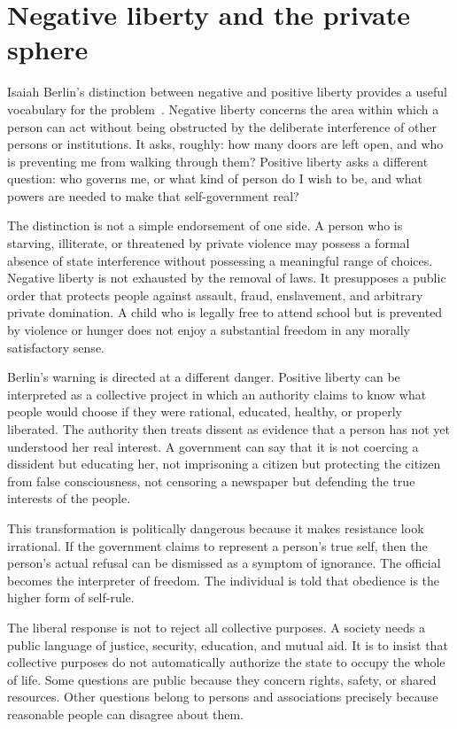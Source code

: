 ﻿\documentclass[12pt,a4paper]{book}
\begin{document}
\section{Negative liberty and the private sphere}

Isaiah Berlin's distinction between negative and positive liberty provides a
useful vocabulary for the problem~\cite{berlin-liberty}.  Negative liberty
concerns the area within which a person can act without being obstructed by
the deliberate interference of other persons or institutions.  It asks,
roughly: how many doors are left open, and who is preventing me from walking
through them?  Positive liberty asks a different question: who governs me,
or what kind of person do I wish to be, and what powers are needed to make
that self-government real?

The distinction is not a simple endorsement of one side.  A person who is
starving, illiterate, or threatened by private violence may possess a formal
absence of state interference without possessing a meaningful range of
choices.  Negative liberty is not exhausted by the removal of laws.  It
presupposes a public order that protects people against assault, fraud,
enslavement, and arbitrary private domination.  A child who is legally free
to attend school but is prevented by violence or hunger does not enjoy a
substantial freedom in any morally satisfactory sense.

Berlin's warning is directed at a different danger.  Positive liberty can
be interpreted as a collective project in which an authority claims to know
what people would choose if they were rational, educated, healthy, or
properly liberated.  The authority then treats dissent as evidence that a
person has not yet understood her real interest.  A government can say that
it is not coercing a dissident but educating her, not imprisoning a citizen
but protecting the citizen from false consciousness, not censoring a
newspaper but defending the true interests of the people.

This transformation is politically dangerous because it makes resistance
look irrational.  If the government claims to represent a person's true
self, then the person's actual refusal can be dismissed as a symptom of
ignorance.  The official becomes the interpreter of freedom.  The individual
is told that obedience is the higher form of self-rule.

The liberal response is not to reject all collective purposes.  A society
needs a public language of justice, security, education, and mutual aid.  It
is to insist that collective purposes do not automatically authorize the
state to occupy the whole of life.  Some questions are public because they
concern rights, safety, or shared resources.  Other questions belong to
persons and associations precisely because reasonable people can disagree
about them.
\end{document}
